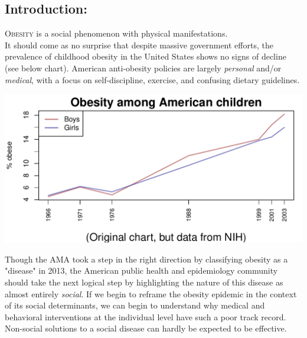 \begin{multicols}{2} %

\section*{Introduction: }

\lettrine[nindent=0em,lines=3]{O}{besity} is a social phenomenon with physical manifestations. \\

It should come as no surprise that despite massive government efforts, the prevalence of childhood obesity in the United States shows no signs of decline \cite{Ogden2014} (see below chart).  American anti-obesity policies are largely \emph{personal} and/or \emph{medical}, with a focus on self-discipline, exercise, and confusing dietary guidelines.  \\

\begin{knitrout}
\color{fgcolor}

{\centering \includegraphics[width=\maxwidth]{figure/fig-plot1} 

}



\end{knitrout}
\cite{NIH}

Though the AMA took a step in the right direction by classifying obesity as a "disease" in 2013, %
the American public health and epidemiology community should take the next logical step by highlighting the nature of this disease as almost entirely \emph{social}.  If we begin to reframe the obesity epidemic in the context of its social determinants, we can begin to understand why medical and behavioral interventions at the individual level have such a poor track record. Non-social solutions to a social disease can hardly be expected to be effective. \\


\end{multicols}

